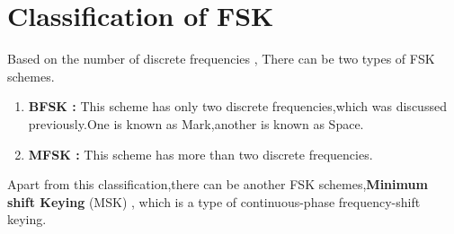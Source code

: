 \documentclass{report}
\begin{document}
\section{Classification of FSK}{
	\bigskip
	Based on the number of discrete frequencies , There can be two types of FSK schemes.
	\begin{enumerate}
		\bigskip
		\item {\textbf{BFSK :} This scheme has only two discrete frequencies,which was discussed previously.One is known as Mark,another is known as Space.}
		\item {\textbf{MFSK :} This scheme has more than two discrete frequencies.}
		
	\end{enumerate}    
	Apart from this classification,there can be another FSK schemes,\textbf{Minimum shift Keying} (MSK) , which is a type of continuous-phase frequency-shift keying.
		
}
\end{document}
